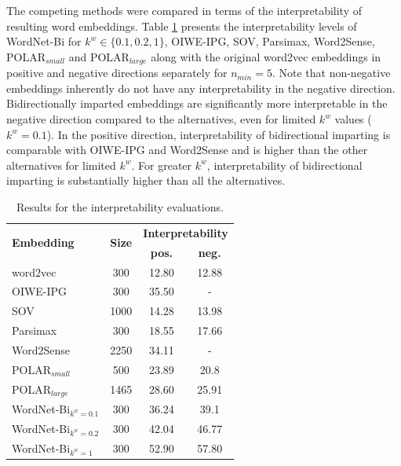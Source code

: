 \documentclass[11pt,a4paper]{article}
\begin{document}
The competing methods were compared in terms of the interpretability of resulting word embeddings. Table \ref{tab:interp_results} presents the interpretability levels of WordNet-Bi for $k^w \in \{0.1, 0.2, 1\}$, OIWE-IPG, SOV, Parsimax, Word2Sense, POLAR$_{small}$ and POLAR$_{large}$ along with the original word2vec embeddings in positive and negative directions separately for $n_{min} = 5$.
Note that non-negative embeddings inherently do not have any interpretability in the negative direction. Bidirectionally imparted embeddings are significantly more interpretable in the negative direction compared to the alternatives, even for limited $k^w$ values ($k^w = 0.1$). In the positive direction, interpretability of bidirectional imparting is comparable with OIWE-IPG and Word2Sense and is higher than the other alternatives for limited $k^w$. For greater $k^w$, interpretability of bidirectional imparting is substantially higher than all the alternatives.

\begin{table}
    \centering
	\begin{tabular}{lccc}
	    \hline \hline
        \multirow{2}{*}{\textbf{Embedding}} & \multirow{2}{*}{\textbf{Size}} &  \multicolumn{2}{c}{\textbf{Interpretability}}\\
                 & & \textbf{pos.} & \textbf{neg.} \\\hline \hline %
        word2vec & 300 & 12.80 & 12.88 \\
        OIWE-IPG & 300 & 35.50 & - \\
        SOV & 1000 & 14.28 & 13.98 \\
        Parsimax & 300 & 18.55 & 17.66\\
        Word2Sense & 2250 & 34.11 & -\\
        POLAR$_{small}$ & 500 & 23.89 & 20.8\\
        POLAR$_{large}$ & 1465 & 28.60 & 25.91\\
        WordNet-Bi$_{k^w = 0.1}$ & 300 & 36.24 & 39.1\\
        WordNet-Bi$_{k^w = 0.2}$ & 300 & 42.04 & 46.77\\
        WordNet-Bi$_{k^w = 1}$ & 300 & 52.90 & 57.80\\
        \hline \hline
	\end{tabular}
	\caption{ Results for the interpretability evaluations. }
	\label{tab:interp_results}
\end{table}
\end{document}
